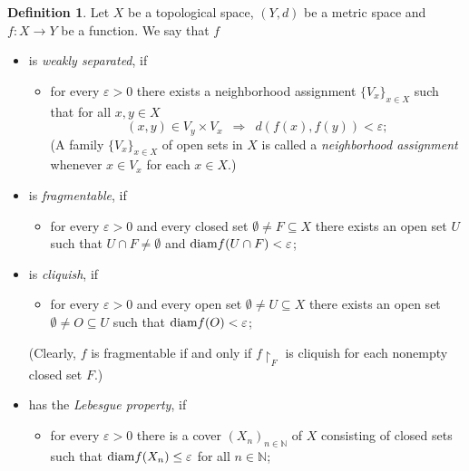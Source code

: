 \documentclass[a4paper]{amsart}
\theoremstyle{plain}
\theoremstyle{definition}
\newtheorem{definition}[theorem]{Definition}
\theoremstyle{remark}
\numberwithin{equation}{section}
\begin{document}
	\begin{definition}\label{OneF}
		Let $X$ be a topological space, $(Y,d)$ be a metric space and $f\colon X\to Y$ be a function. 
		We say that $f$
		\begin{itemize}
			\item is {\it weakly separated}, if 
			\begin{itemize}
				\item[{\rm (WS)}] for every $\varepsilon>0$ there exists a neighborhood assignment $\{V_x\}_{x\in X}$ such that for all $x,y\in X$
				\begin{equation*} 
					(x,y)\in V_{y}\times V_{x} \,\,\,\Longrightarrow\,\,\, d(f(x),f(y))<\varepsilon;
				\end{equation*} 
				(A family $\{V_x\}_{x\in X}$ of open sets in $X$  is called a \emph{neighborhood assignment} whenever $x\in V_x$ for each $x\in X$.) 
			\end{itemize} 
			
			\item is {\it fragmentable}, if 
			\begin{itemize}
				\item[{\rm (Frag)}] for every  $\varepsilon>0$ and every closed set $\emptyset\ne F\subseteq X$ there exists an open set $U$ such that $U\cap F\neq\emptyset$ and ${\rm diam} f(U\cap F)<\varepsilon$;
			\end{itemize}
			
		    \item is {\it cliquish}, if  
		    \begin{itemize}
		    	\item[{\rm (Cliq)}] for every  $\varepsilon>0$ and every  open set $\emptyset\ne U\subseteq X$ there exists an open set $\emptyset\ne O\subseteq U$ such that  ${\rm diam} f(O)<\varepsilon$;
		    \end{itemize}
            (Clearly, $f$ is fragmentable if and only if $f\restriction_F$ is cliquish for each nonempty closed set $F$.)
			
			\item has the \emph{Lebesgue property}, if 
			\begin{itemize}
				\item[{\rm (LP)}] for every $\varepsilon >0$ there is a cover 
				$(X_n)_{n\in\mathbb N}$ of $X$ consisting of closed sets such that ${\rm diam}f(X_n)\le\varepsilon$ for all $n\in\mathbb N$;
			\end{itemize}
						

\end{itemize}
\end{definition}
\end{document}
